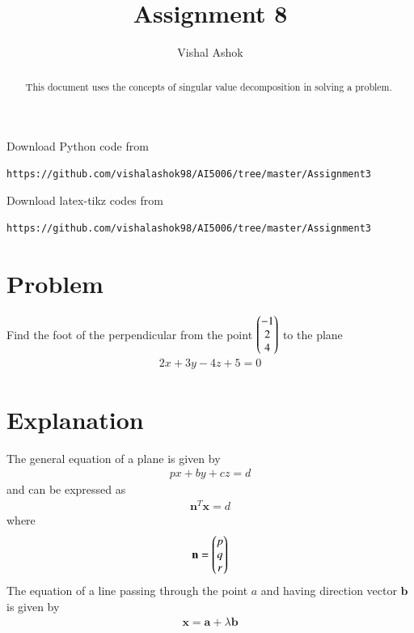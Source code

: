 \documentclass[journal,12pt,twocolumn]{IEEEtran}
\begin{document}
\makeatletter
{}
\makeatother
\let\StandardTheFigure\thefigure
\let\vec\mathbf
\renewcommand{\thefigure}{\theproblem}
\def\putbox#1#2#3{\makebox[0in][l]{\makebox[#1][l]{}\raisebox{\baselineskip}[0in][0in]{\raisebox{#2}[0in][0in]{#3}}}}
     \def\rightbox#1{\makebox[0in][r]{#1}}
     \def\centbox#1{\makebox[0in]{#1}}
     \def\topbox#1{\raisebox{-\baselineskip}[0in][0in]{#1}}
     \def\midbox#1{\raisebox{-0.5\baselineskip}[0in][0in]{#1}}
\vspace{3cm}
\title{Assignment 8}
\author{Vishal Ashok}
\maketitle
\newpage
\bigskip
\renewcommand{\thefigure}{\theenumi}
\renewcommand{\thetable}{\theenumi}
\begin{abstract}
This document uses the concepts of singular value decomposition in solving a problem.
\end{abstract}
Download Python code from 
%
\begin{lstlisting}
https://github.com/vishalashok98/AI5006/tree/master/Assignment3\end{lstlisting}
%
Download latex-tikz codes from 
%
\begin{lstlisting}
https://github.com/vishalashok98/AI5006/tree/master/Assignment3\end{lstlisting}
%
\section{Problem}
Find the foot of the perpendicular from the point  $\begin{pmatrix}-1 \\ 2 \\ 4\end{pmatrix}$ to the plane 
\begin{align}
    2x + 3y - 4z +5 = 0  \label{given_plane_eq}
\end{align}
\section{Explanation}
The general equation of a plane is given by
\begin{align}
    px+by+cz = d \label{gen_plane_eqn}
\end{align}
and can be expressed as
\begin{align}
    \vec{n}^T\vec{x} = d \label{plane_vec_eqn}
\end{align}
where
\begin{align}
    \vec{n} = \myvec{p \\ q \\ r}
\end{align}
The equation of a line passing through the point $a$ and having direction vector $\vec{b}$ is given by
\begin{align}
    \vec{x} = \vec{a} +\lambda \vec{b} \label{vec_line_eq}
\end{align}
\end{document}

